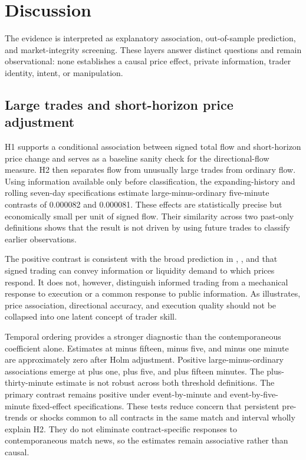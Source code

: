 \section{Discussion}
\label{sec:discussion}

The evidence is interpreted as explanatory association, out-of-sample prediction, and market-integrity screening. These layers answer distinct questions and remain observational: none establishes a causal price effect, private information, trader identity, intent, or manipulation.

\subsection{Large trades and short-horizon price adjustment}

H1 supports a conditional association between signed total flow and short-horizon price change and serves as a baseline sanity check for the directional-flow measure. H2 then separates flow from unusually large trades from ordinary flow. Using information available only before classification, the expanding-history and rolling seven-day specifications estimate large-minus-ordinary five-minute contrasts of 0.000082 and 0.000081. These effects are statistically precise but economically small per unit of signed flow. Their similarity across two past-only definitions shows that the result is not driven by using future trades to classify earlier observations.

The positive contrast is consistent with the broad prediction in \citet{kyle1985continuous}, \citet{glostenmilgrom1985bidask}, and \citet{easleyohara1987tradesize} that signed trading can convey information or liquidity demand to which prices respond. It does not, however, distinguish informed trading from a mechanical response to execution or a common response to public information. As \citet{dellavedova2026execution} illustrates, price association, directional accuracy, and execution quality should not be collapsed into one latent concept of trader skill.

Temporal ordering provides a stronger diagnostic than the contemporaneous coefficient alone. Estimates at minus fifteen, minus five, and minus one minute are approximately zero after Holm adjustment. Positive large-minus-ordinary associations emerge at plus one, plus five, and plus fifteen minutes. The plus-thirty-minute estimate is not robust across both threshold definitions. The primary contrast remains positive under event-by-minute and event-by-five-minute fixed-effect specifications. These tests reduce concern that persistent pre-trends or shocks common to all contracts in the same match and interval wholly explain H2. They do not eliminate contract-specific responses to contemporaneous match news, so the estimates remain associative rather than causal.

